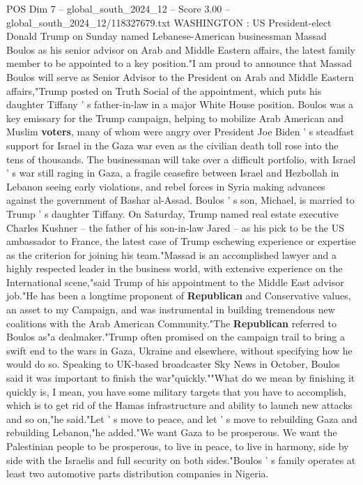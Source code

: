 \begin{textsample}{POS Dim 7 – global\_south\_2024\_12 – Score 3.00 – global\_south\_2024\_12/118327679.txt}  \label{ex:f7_pos_355}
WASHINGTON : US President-elect Donald Trump on Sunday named Lebanese-American businessman Massad Boulos as his senior advisor on Arab and Middle Eastern affairs, the latest family member to be appointed to a key position."I am proud to announce that Massad Boulos will serve as Senior Advisor to the President on Arab and Middle Eastern affairs,"Trump posted on Truth Social of the appointment, which puts his daughter Tiffany ' s father-in-law in a major White House position.
Boulos was a key emissary for the Trump campaign, helping to mobilize Arab American and Muslim \textbf{voters}, many of whom were angry over President Joe Biden ' s steadfast support for Israel in the Gaza war even as the civilian death toll rose into the tens of thousands.
The businessman will take over a difficult portfolio, with Israel ' s war still raging in Gaza, a fragile ceasefire between Israel and Hezbollah in Lebanon seeing early violations, and rebel forces in Syria making advances against the government of Bashar al-Assad.
Boulos ' s son, Michael, is married to Trump ' s daughter Tiffany.
On Saturday, Trump named real estate executive Charles Kushner -- the father of his son-in-law Jared -- as his pick to be the US ambassador to France, the latest case of Trump eschewing experience or expertise as the criterion for joining his team."Massad is an accomplished lawyer and a highly respected leader in the business world, with extensive experience on the International scene,"said Trump of his appointment to the Middle East advisor job."He has been a longtime proponent of \textbf{Republican} and Conservative values, an asset to my Campaign, and was instrumental in building tremendous new coalitions with the Arab American Community."The \textbf{Republican} referred to Boulos as"a dealmaker."Trump often promised on the campaign trail to bring a swift end to the wars in Gaza, Ukraine and elsewhere, without specifying how he would do so.
Speaking to UK-based broadcaster Sky News in October, Boulos said it was important to finish the war"quickly.""What do we mean by finishing it quickly is, I mean, you have some military targets that you have to accomplish, which is to get rid of the Hamas infrastructure and ability to launch new attacks and so on,"he said."Let ' s move to peace, and let ' s move to rebuilding Gaza and rebuilding Lebanon,"he added."We want Gaza to be prosperous.
We want the Palestinian people to be prosperous, to live in peace, to live in harmony, side by side with the Israelis and full security on both sides."Boulos ' s family operates at least two automotive parts distribution companies in Nigeria.

\end{textsample}
